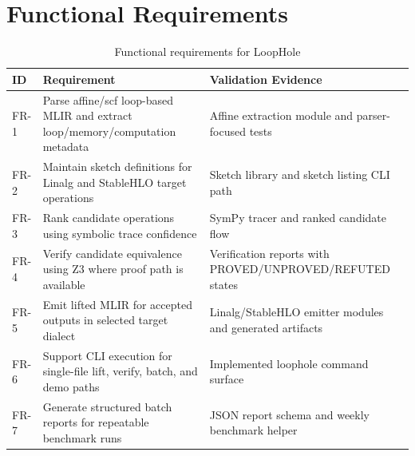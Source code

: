 \section{Functional Requirements}
\begin{table}[H]
\centering
\caption{Functional requirements for LoopHole}
\begin{tabular}{|p{1.5cm}|p{6.0cm}|p{7.0cm}|}
\hline
\textbf{ID} & \textbf{Requirement} & \textbf{Validation Evidence} \\
\hline
FR-1 & Parse affine/scf loop-based MLIR and extract loop/memory/computation metadata & Affine extraction module and parser-focused tests \\
\hline
FR-2 & Maintain sketch definitions for Linalg and StableHLO target operations & Sketch library and sketch listing CLI path \\
\hline
FR-3 & Rank candidate operations using symbolic trace confidence & SymPy tracer and ranked candidate flow \\
\hline
FR-4 & Verify candidate equivalence using Z3 where proof path is available & Verification reports with PROVED/UNPROVED/REFUTED states \\
\hline
FR-5 & Emit lifted MLIR for accepted outputs in selected target dialect & Linalg/StableHLO emitter modules and generated artifacts \\
\hline
FR-6 & Support CLI execution for single-file lift, verify, batch, and demo paths & Implemented loophole command surface \\
\hline
FR-7 & Generate structured batch reports for repeatable benchmark runs & JSON report schema and weekly benchmark helper \\
\hline
\end{tabular}
\end{table}

